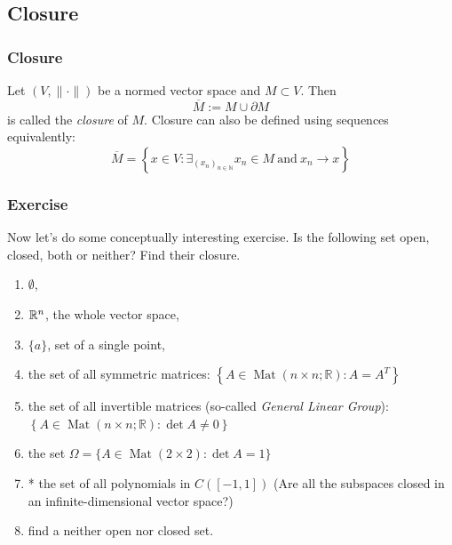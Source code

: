 \documentclass[12pt, t]{beamer}
\renewcommand{\emph}[1]{{\color{Turquoise3}\textsl{#1}}}
\newcommand{\N}{\mathbb{N}}
\begin{document}
\subsection{Closure}
\begin{frame}
    \frametitle{Closure}
    Let $(V,\|\cdot\|)$ be a normed vector space and $M\subset V$. Then
    \[\overline{M}:=M\cup\partial M\]
    is called the \emph{closure} of $M$.
    Closure can also be defined using sequences equivalently:
    \begin{equation}\label{2.1.8}
        \overline{M}=\left\{x\in V:\mathop{\exists}_{(x_n)_{n\in\N}}x_n\in M~\text{and}~x_n\to x\right\}
    \end{equation}


\end{frame}

\begin{frame}
    \frametitle{Exercise}
    Now let's do some conceptually interesting exercise. Is the following set open, closed, both or neither? Find their closure.
    \begin{enumerate}
        \item $\emptyset$,
        \item $\mathbb{R}^n$, the whole vector space,
        \item $\{a\}$, set of a single point,
        \item the set of all symmetric matrices: $\left\{A \in \operatorname{Mat}(n \times n ; \mathbb{R}): A=A^{T}\right\}$
        \item the set of all invertible matrices (so-called \textit{General Linear Group}): $\left\{A \in \operatorname{Mat}(n \times n ; \mathbb{R}): \det A\neq 0\right\}$
        \item the set $\Omega=\{A \in \operatorname{Mat}(2 \times 2): \operatorname{det} A=1\}$
        \item * the set of all polynomials in $C([-1,1])$ (Are all the subspaces closed in an infinite-dimensional vector space?)
        \item find a neither open nor closed set.
    \end{enumerate}
\end{frame}
\end{document}
